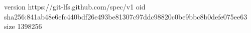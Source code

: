 version https://git-lfs.github.com/spec/v1
oid sha256:841ab48e6efc440bdf26e493be81307c97ddc98820c0be9bbc8b0defe075ee63
size 1398256

